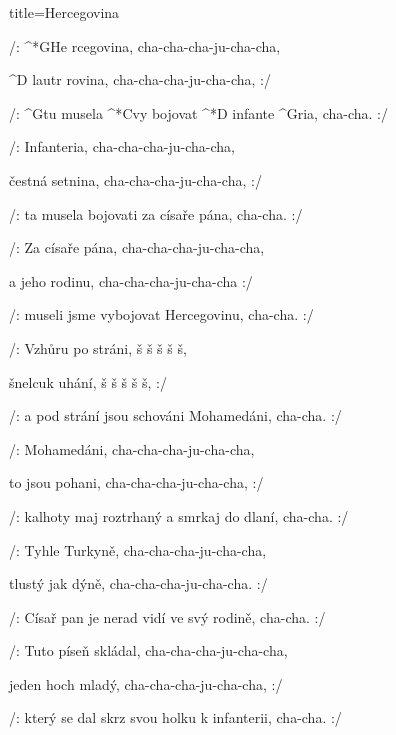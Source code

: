 \begin{song}{title=\predtitle\centering Hercegovina \\\large \vspace*{-0.3cm}}  %
\begin{centerjustified}
\nejnejvetsi

\sloka 
	/: ^*{G}He  rcegovina, cha-cha-cha-ju-cha-cha,
	
	^{D \z}lautr rovina, cha-cha-cha-ju-cha-cha, :/
	
	/: ^{G}tu musela ^*{C}vy bojovat ^*{D \z}infante ^{G}ria, cha-cha. :/
	
\sloka
	/: Infanteria, cha-cha-cha-ju-cha-cha,
	
	čestná setnina, cha-cha-cha-ju-cha-cha, :/
	
	/: ta musela bojovati za císaře pána, cha-cha. :/
	
\sloka
	/: Za císaře pána, cha-cha-cha-ju-cha-cha,
	
	a jeho rodinu, cha-cha-cha-ju-cha-cha :/
	
	/: museli jsme vybojovat Hercegovinu, cha-cha. :/
	
\sloka
	/: Vzhůru po stráni, š š š š š,
	
	šnelcuk uhání, š š š š š, :/
	
	/: a pod strání jsou schováni Mohamedáni, cha-cha. :/
	
\sloka
	/: Mohamedáni, cha-cha-cha-ju-cha-cha,
	
	to jsou pohani, cha-cha-cha-ju-cha-cha, :/
	
	/: kalhoty maj roztrhaný a smrkaj do dlaní, cha-cha. :/
	
\sloka
	/: Tyhle Turkyně, cha-cha-cha-ju-cha-cha,
	
	tlustý jak dýně, cha-cha-cha-ju-cha-cha. :/
	
	/: Císař pan je nerad vidí ve svý rodině, cha-cha. :/
	
\sloka
	/: Tuto píseň skládal, cha-cha-cha-ju-cha-cha,
	
	jeden hoch mladý, cha-cha-cha-ju-cha-cha, :/
	
	/: který se dal skrz svou holku k infanterii, cha-cha. :/
	

\end{centerjustified}
\setcounter{Slokočet}{0}
\end{song}
